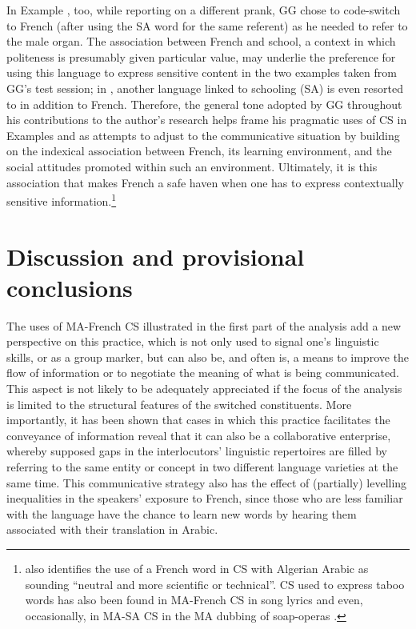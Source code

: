 \documentclass[output=paper]{langscibook}
\begin{document}
In Example , too, while reporting on a different prank, GG chose to code-switch to French (after using the \gls*{SA} word for the same referent) as he needed to refer to the male organ. The association between French and school, a context in which politeness is presumably given particular value, may underlie the preference for using this language to express sensitive content in the two examples taken from GG’s test session; in  , another language linked to schooling (\gls*{SA}) is even resorted to in addition to French. Therefore, the general tone adopted by GG throughout his contributions to the author’s research helps frame his pragmatic uses of \gls*{CS} in Examples  and  as attempts to adjust to the communicative situation by building on the indexical association between French, its learning environment, and the social attitudes promoted within such an environment. Ultimately, it is this association that makes French a safe haven when one has to express contextually sensitive information.\footnote{\citet[236]{caubet_jeux_2002} also identifies the use of a French word in \gls*{CS} with Algerian Arabic as sounding “neutral and more scientific or technical”. \gls*{CS} used to express taboo words has also been found in \gls*{MA}-French \gls*{CS} in song lyrics \citep[200--202]{bentahila_language_2002} and even, occasionally, in \gls*{MA}-\gls*{SA} \gls*{CS} in the \gls*{MA} dubbing of soap-operas \citep[233--236]{ziamari_ana_2013}.}

\section{Discussion and provisional conclusions}
The uses of \gls*{MA}-French \gls*{CS} illustrated in the first part of the analysis add a new perspective on this practice, which is not only used to signal one’s linguistic skills, or as a group marker, but can also be, and often is, a means to improve the flow of information or to negotiate the meaning of what is being communicated. This aspect is not likely to be adequately appreciated if the focus of the analysis is limited to the structural features of the switched constituents. More importantly, it has been shown that cases in which this practice facilitates the conveyance of information reveal that it can also be a collaborative enterprise, whereby supposed gaps in the interlocutors’ linguistic repertoires are filled by referring to the same entity or concept in two different language varieties at the same time. This communicative strategy also has the effect of (partially) levelling inequalities in the speakers’ exposure to French, since those who are less familiar with the language have the chance to learn new words by hearing them associated with their translation in Arabic. 
\end{document}

